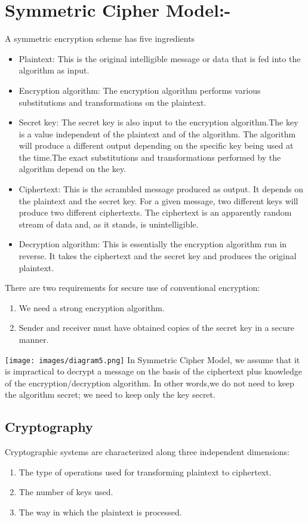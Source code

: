 \documentclass{article}
\begin{document}
\section{Symmetric Cipher Model:-}
A symmetric encryption scheme has five ingredients
\begin{itemize}
    \item Plaintext: This is the original intelligible message or data that is fed into the algorithm as input.
    \item Encryption algorithm: The encryption algorithm performs various substitutions and transformations on the plaintext.
    \item Secret key: The secret key is also input to the encryption algorithm.The key is a value independent of the plaintext and of the algorithm. The algorithm will produce a different output depending on the specific key being used at the time.The exact substitutions and transformations performed by the algorithm depend on the key.
    \item Ciphertext: This is the scrambled message produced as output. It depends on the plaintext and the secret key. For a given message, two different keys will produce two different ciphertexts. The ciphertext is an apparently random stream of data and, as it stands, is unintelligible.
    \item Decryption algorithm: This is essentially the encryption algorithm run in reverse. It takes the ciphertext and the secret key and produces the original plaintext.
\end{itemize}

There are two requirements for secure use of conventional encryption:
\begin{enumerate}
    \item We need a strong encryption algorithm.
    \item Sender and receiver must have obtained copies of the secret key in a secure manner.
\end{enumerate}
\texttt{[image: images/diagram5.png]}
In Symmetric Cipher Model, we assume that it is impractical to decrypt a message on the basis of the ciphertext plus knowledge of the encryption/decryption algorithm. In other words,we do not need to keep the algorithm secret; we need to keep only the key secret.
\subsection{Cryptography}
Cryptographic systems are characterized along three independent dimensions:
\begin{enumerate}
    \item The type of operations used for transforming plaintext to ciphertext.
    \item The number of keys used.
    \item The way in which the plaintext is processed.
\end{enumerate}
\end{document}
